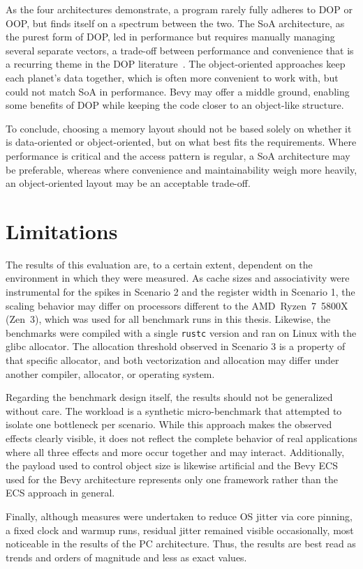As the four architectures demonstrate, a program rarely fully adheres to \ac{DOP} or \ac{OOP}, but finds itself on a spectrum between the two. The \ac{SoA} architecture, as the purest form of \ac{DOP}, led in performance but requires manually managing several separate vectors, a trade-off between performance and convenience that is a recurring theme in the \ac{DOP} literature~\cite{fabian2018data}. The object-oriented approaches keep each planet's data together, which is often more convenient to work with, but could not match \ac{SoA} in performance. Bevy may offer a middle ground, enabling some benefits of \ac{DOP} while keeping the code closer to an object-like structure. 

To conclude, choosing a memory layout should not be based solely on whether it is data-oriented or object-oriented, but on what best fits the requirements. Where performance is critical and the access pattern is regular, a \ac{SoA} architecture may be preferable, whereas where convenience and maintainability weigh more heavily, an object-oriented layout may be an acceptable trade-off.
\section{Limitations}
\label{sec:evaluation:limitations}
The results of this evaluation are, to a certain extent, dependent on the environment in which they were measured. As cache sizes and associativity were instrumental for the spikes in Scenario 2 and the register width in Scenario 1, the scaling behavior may differ on processors different to the \mbox{AMD Ryzen 7 5800X} (Zen~3), which was used for all benchmark runs in this thesis. Likewise, the benchmarks were compiled with a single \texttt{rustc} version and ran on Linux with the glibc allocator. The allocation threshold observed in Scenario 3 is a property of that specific allocator, and both vectorization and allocation may differ under another compiler, allocator, or operating system.

Regarding the benchmark design itself, the results should not be generalized without care. The workload is a synthetic micro-benchmark that attempted to isolate one bottleneck per scenario. While this approach makes the observed effects clearly visible, it does not reflect the complete behavior of real applications where all three effects and more occur together and may interact. Additionally, the payload used to control object size is likewise artificial and the Bevy \ac{ECS} used for the Bevy architecture represents only one framework rather than the \ac{ECS} approach in general. 

Finally, although measures were undertaken to reduce OS jitter via core pinning, a fixed clock and warmup runs, residual jitter remained visible occasionally, most noticeable in the results of the \ac{PC} architecture. Thus, the results are best read as trends and orders of magnitude and less as exact values. 

